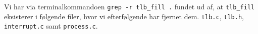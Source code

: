 Vi har via terminalkommandoen \verb+grep -r tlb_fill .+ fundet ud af, at \verb+tlb_fill+ eksisterer i følgende
filer, hvor vi efterfølgende har fjernet dem. \verb+tlb.c+, \verb+tlb.h+, \verb+interrupt.c+ samt 
\verb+process.c+.
